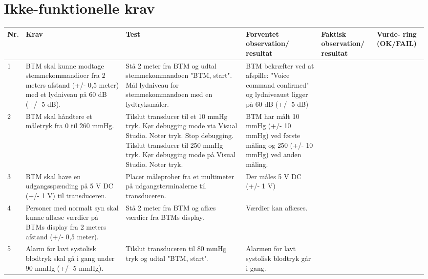 \section{Ikke-funktionelle krav}
\begin{table}[H]
\begin{tabular}{|p{0.5cm}|p{4cm}|p{3cm}|p{3cm}|p{3cm}|p{1cm}|}
\hline
\textbf{Nr.} & \textbf{Krav} & \textbf{Test}& \textbf{Forventet observation/ resultat}& \textbf{Faktisk observation/ resultat}& \textbf{Vurde- ring (OK/FAIL)}\\\hline
 1 & BTM skal kunne modtage stemmekommandioer fra 2 meters afstand (+/- 0,5 meter) med et lydniveau på 60 dB (+/- 5 dB). & Stå 2 meter fra BTM og udtal stemmekommandoen "BTM, start". Mål lydniveau for stemmekommandoen med en lydtryksmåler. & BTM bekræfter ved at afspille: "Voice command confirmed" og lydniveauet ligger på 60 dB (+/- 5 dB)&  &  \\\hline
 2 & BTM skal håndtere et måletryk fra 0 til 260 mmHg. & Tilslut transducer til et 10 mmHg tryk. Kør debugging mode via Visual Studio. Noter tryk. Stop debugging. Tilslut transducer til 250 mmHg tryk. Kør debugging mode på Visual Studio. Noter tryk. & BTM har målt 10 mmHg (+/- 10 mmHg) ved første måling og 250 (+/- 10 mmHg) ved anden måling. & & \\\hline
 3 & BTM skal have en udgangsspænding på 5 V DC (+/- 1 V) til transduceren. & Placer måleprober fra et multimeter på udgangsterminalerne til transduceren. & Der måles 5 V DC (+/- 1 V) & &  \\\hline
 4 & Personer med normalt syn skal kunne aflæse værdier på BTMs display fra 2 meters afstand (+/- 0,5 meter). & Stå 2 meter fra BTM og aflæs værdier fra BTMs display. & Værdier kan aflæses. & &  \\\hline
 5 & Alarm for lavt systolisk blodtryk skal gå i gang under 90 mmHg (+/- 5 mmHg).} & Tilslut transduceren til 80 mmHg tryk og udtal "BTM, start". & Alarmen for lavt systolisk blodtryk går i gang. & & \\\hline
\end{tabular}
\end{table}
\newpage
